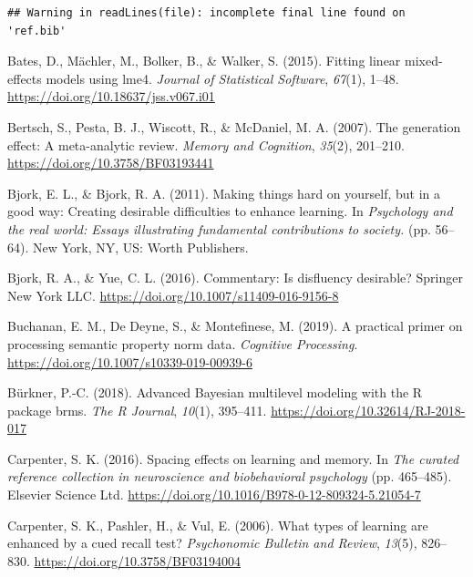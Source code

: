 \documentclass[english,pdf]{apa6}
\begin{document}
\begin{verbatim}
## Warning in readLines(file): incomplete final line found on 'ref.bib'
\end{verbatim}

\begingroup
\setlength{\parindent}{-0.5in}
\setlength{\leftskip}{0.5in}

\hypertarget{refs}{}
\leavevmode\hypertarget{ref-Bates2015}{}%
Bates, D., Mächler, M., Bolker, B., \& Walker, S. (2015). Fitting linear mixed-effects models using lme4. \emph{Journal of Statistical Software}, \emph{67}(1), 1--48. \url{https://doi.org/10.18637/jss.v067.i01}

\leavevmode\hypertarget{ref-Bertsch2007}{}%
Bertsch, S., Pesta, B. J., Wiscott, R., \& McDaniel, M. A. (2007). The generation effect: A meta-analytic review. \emph{Memory and Cognition}, \emph{35}(2), 201--210. \url{https://doi.org/10.3758/BF03193441}

\leavevmode\hypertarget{ref-Bjork2011}{}%
Bjork, E. L., \& Bjork, R. A. (2011). Making things hard on yourself, but in a good way: Creating desirable difficulties to enhance learning. In \emph{Psychology and the real world: Essays illustrating fundamental contributions to society.} (pp. 56--64). New York, NY, US: Worth Publishers.

\leavevmode\hypertarget{ref-Bjork2016}{}%
Bjork, R. A., \& Yue, C. L. (2016). Commentary: Is disfluency desirable? Springer New York LLC. \url{https://doi.org/10.1007/s11409-016-9156-8}

\leavevmode\hypertarget{ref-Buchanan2019}{}%
Buchanan, E. M., De Deyne, S., \& Montefinese, M. (2019). A practical primer on processing semantic property norm data. \emph{Cognitive Processing}. \url{https://doi.org/10.1007/s10339-019-00939-6}

\leavevmode\hypertarget{ref-Burkner2018}{}%
Bürkner, P.-C. (2018). Advanced Bayesian multilevel modeling with the R package brms. \emph{The R Journal}, \emph{10}(1), 395--411. \url{https://doi.org/10.32614/RJ-2018-017}

\leavevmode\hypertarget{ref-Carpenter2016}{}%
Carpenter, S. K. (2016). Spacing effects on learning and memory. In \emph{The curated reference collection in neuroscience and biobehavioral psychology} (pp. 465--485). Elsevier Science Ltd. \url{https://doi.org/10.1016/B978-0-12-809324-5.21054-7}

\leavevmode\hypertarget{ref-Carpenter2006}{}%
Carpenter, S. K., Pashler, H., \& Vul, E. (2006). What types of learning are enhanced by a cued recall test? \emph{Psychonomic Bulletin and Review}, \emph{13}(5), 826--830. \url{https://doi.org/10.3758/BF03194004}
\end{document}
